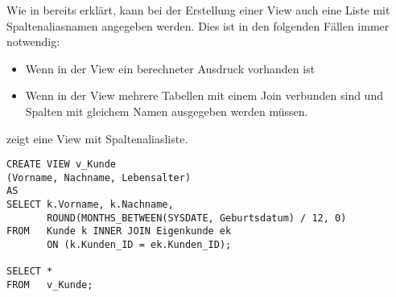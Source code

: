         Wie in  bereits erkl\"art, kann bei der Erstellung einer View auch eine Liste mit Spaltenaliasnamen angegeben werden. Dies ist in den folgenden F\"allen immer notwendig:
        \begin{itemize}
          \item Wenn in der View ein berechneter Ausdruck vorhanden ist
          \item Wenn in der View mehrere Tabellen mit einem Join verbunden sind und Spalten mit gleichem Namen ausgegeben werden m\"ussen.
        \end{itemize}
         zeigt eine View mit Spaltenaliasliste.
\clearpage
        \begin{lstlisting}[language=oracle_sql,caption={Eine einfache View mit Spaltenaliasliste},label=sql08_29]
CREATE VIEW v_Kunde
(Vorname, Nachname, Lebensalter)
AS
SELECT k.Vorname, k.Nachname,
       ROUND(MONTHS_BETWEEN(SYSDATE, Geburtsdatum) / 12, 0)
FROM   Kunde k INNER JOIN Eigenkunde ek
       ON (k.Kunden_ID = ek.Kunden_ID);

SELECT *
FROM   v_Kunde;
        \end{lstlisting}
